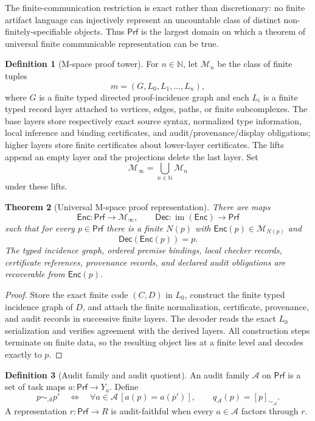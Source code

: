 \documentclass[11pt]{article}
\newcommand{\Proofs}{\ensuremath{\mathsf{Prf}}}
\newcommand{\MInf}{\ensuremath{\mathcal M_\infty}}
\newcommand{\MEnc}{\ensuremath{\mathsf{Enc}}}
\newcommand{\MDec}{\ensuremath{\mathsf{Dec}}}
\newcommand{\AuditQuot}{\ensuremath{q_{\mathcal A}}}
\newcommand{\AuditEq}{\ensuremath{\sim_{\mathcal A}}}
\theoremstyle{plain}
\newtheorem{theorem}{Theorem}[section]
\theoremstyle{definition}
\newtheorem{definition}[theorem]{Definition}
\theoremstyle{remark}
\begin{document}
The finite-communication restriction is exact rather than discretionary: no
finite artifact language can injectively represent an uncountable class of
distinct non-finitely-specifiable objects.  Thus $\Proofs$ is the largest
domain on which a theorem of universal finite communicable representation can
be true.

\begin{definition}[M-space proof tower]
\label{def:mtower-v9}
For $n\in\mathbb N$, let $\mathcal M_n$ be the class of finite tuples
\[
m=(G,L_0,L_1,\ldots,L_n),
\]
where $G$ is a finite typed directed proof-incidence graph and each $L_i$ is a
finite typed record layer attached to vertices, edges, paths, or finite
subcomplexes.  The base layers store respectively exact source syntax,
normalized type information, local inference and binding certificates, and
audit/provenance/display obligations; higher layers store finite certificates
about lower-layer certificates.  The lifts append an empty layer and the
projections delete the last layer.  Set
\[
\MInf=\bigcup_{n\in\mathbb N}\mathcal M_n
\]
under these lifts.
\end{definition}

\begin{theorem}[Universal M-space proof representation]
\label{thm:universal-v9}
There are maps
\[
\MEnc:\Proofs\longrightarrow\MInf,
\qquad
\MDec:\operatorname{im}(\MEnc)\longrightarrow\Proofs
\]
such that for every $p\in\Proofs$ there is a finite $N(p)$ with
$\MEnc(p)\in\mathcal M_{N(p)}$ and
\[
\MDec(\MEnc(p))=p.
\]
The typed incidence graph, ordered premise bindings, local checker records,
certificate references, provenance records, and declared audit obligations are
recoverable from $\MEnc(p)$.
\end{theorem}

\begin{proof}
Store the exact finite code $(C,D)$ in $L_0$, construct the finite typed
incidence graph of $D$, and attach the finite normalization, certificate,
provenance, and audit records in successive finite layers.  The decoder reads
the exact $L_0$ serialization and verifies agreement with the derived layers.
All construction steps terminate on finite data, so the resulting object lies
at a finite level and decodes exactly to $p$.
\end{proof}

\begin{definition}[Audit family and audit quotient]
\label{def:auditquot-v9}
An audit family $\mathcal A$ on $\Proofs$ is a set of task maps
$a:\Proofs\to Y_a$.  Define
\[
p\AuditEq p'
\quad\Longleftrightarrow\quad
\forall a\in\mathcal A\,[a(p)=a(p')],
\qquad
\AuditQuot(p)=[p]_{\AuditEq}.
\]
A representation $r:\Proofs\to R$ is audit-faithful when every
$a\in\mathcal A$ factors through $r$.
\end{definition}
\end{document}
